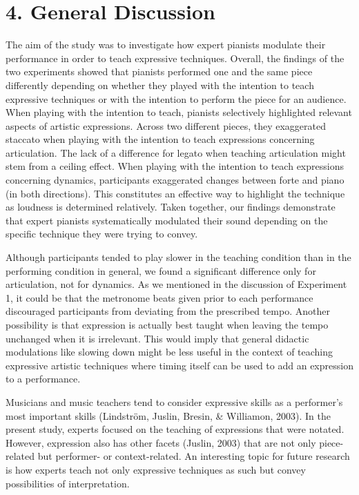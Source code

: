 \documentclass[
  english,
  man,floatsintext]{apa6}
\begin{document}
\newpage

\hypertarget{general-discussion}{%
\section{4. General Discussion}\label{general-discussion}}

The aim of the study was to investigate how expert pianists modulate their performance in order to teach expressive techniques. Overall, the findings of the two experiments showed that pianists performed one and the same piece differently depending on whether they played with the intention to teach expressive techniques or with the intention to perform the piece for an audience. When playing with the intention to teach, pianists selectively highlighted relevant aspects of artistic expressions. Across two different pieces, they exaggerated staccato when playing with the intention to teach expressions concerning articulation. The lack of a difference for legato when teaching articulation might stem from a ceiling effect. When playing with the intention to teach expressions concerning dynamics, participants exaggerated changes between forte and piano (in both directions). This constitutes an effective way to highlight the technique as loudness is determined relatively. Taken together, our findings demonstrate that expert pianists systematically modulated their sound depending on the specific technique they were trying to convey.

Although participants tended to play slower in the teaching condition than in the performing condition in general, we found a significant difference only for articulation, not for dynamics. As we mentioned in the discussion of Experiment 1, it could be that the metronome beats given prior to each performance discouraged participants from deviating from the prescribed tempo. Another possibility is that expression is actually best taught when leaving the tempo unchanged when it is irrelevant. This would imply that general didactic modulations like slowing down might be less useful in the context of teaching expressive artistic techniques where timing itself can be used to add an expression to a performance.

Musicians and music teachers tend to consider expressive skills as a performer's most important skills (Lindström, Juslin, Bresin, \& Williamon, 2003). In the present study, experts focused on the teaching of expressions that were notated. However, expression also has other facets (Juslin, 2003) that are not only piece-related but performer- or context-related. An interesting topic for future research is how experts teach not only expressive techniques as such but convey possibilities of interpretation.
\end{document}
